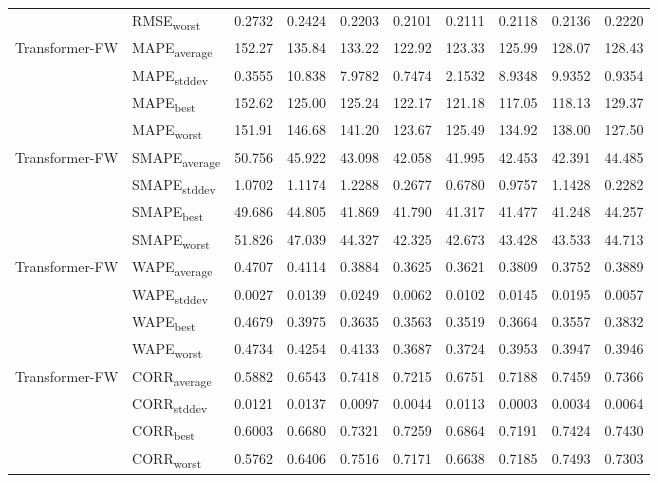 {\begin{longtable}{l l c c c c c c c c}
 & RMSE\textsubscript{worst} & 0.2732 & 0.2424 & 0.2203 & 0.2101 & 0.2111 & 0.2118 & 0.2136 & 0.2220 \\
\cmidrule(lr){2-10}
\multirow{4}{*}{Transformer-FW} & MAPE\textsubscript{average} & 152.27 & 135.84 & 133.22 & 122.92 & 123.33 & 125.99 & 128.07 & 128.43 \\
 & MAPE\textsubscript{stddev} & 0.3555 & 10.838 & 7.9782 & 0.7474 & 2.1532 & 8.9348 & 9.9352 & 0.9354 \\
 & MAPE\textsubscript{best} & 152.62 & 125.00 & 125.24 & 122.17 & 121.18 & 117.05 & 118.13 & 129.37 \\
 & MAPE\textsubscript{worst} & 151.91 & 146.68 & 141.20 & 123.67 & 125.49 & 134.92 & 138.00 & 127.50 \\
\cmidrule(lr){2-10}
\multirow{4}{*}{Transformer-FW} & SMAPE\textsubscript{average} & 50.756 & 45.922 & 43.098 & 42.058 & 41.995 & 42.453 & 42.391 & 44.485 \\
 & SMAPE\textsubscript{stddev} & 1.0702 & 1.1174 & 1.2288 & 0.2677 & 0.6780 & 0.9757 & 1.1428 & 0.2282 \\
 & SMAPE\textsubscript{best} & 49.686 & 44.805 & 41.869 & 41.790 & 41.317 & 41.477 & 41.248 & 44.257 \\
 & SMAPE\textsubscript{worst} & 51.826 & 47.039 & 44.327 & 42.325 & 42.673 & 43.428 & 43.533 & 44.713 \\
\cmidrule(lr){2-10}
\multirow{4}{*}{Transformer-FW} & WAPE\textsubscript{average} & 0.4707 & 0.4114 & 0.3884 & 0.3625 & 0.3621 & 0.3809 & 0.3752 & 0.3889 \\
 & WAPE\textsubscript{stddev} & 0.0027 & 0.0139 & 0.0249 & 0.0062 & 0.0102 & 0.0145 & 0.0195 & 0.0057 \\
 & WAPE\textsubscript{best} & 0.4679 & 0.3975 & 0.3635 & 0.3563 & 0.3519 & 0.3664 & 0.3557 & 0.3832 \\
 & WAPE\textsubscript{worst} & 0.4734 & 0.4254 & 0.4133 & 0.3687 & 0.3724 & 0.3953 & 0.3947 & 0.3946 \\
\cmidrule(lr){2-10}
\multirow{4}{*}{Transformer-FW} & CORR\textsubscript{average} & 0.5882 & 0.6543 & 0.7418 & 0.7215 & 0.6751 & 0.7188 & 0.7459 & 0.7366 \\
 & CORR\textsubscript{stddev} & 0.0121 & 0.0137 & 0.0097 & 0.0044 & 0.0113 & 0.0003 & 0.0034 & 0.0064 \\
 & CORR\textsubscript{best} & 0.6003 & 0.6680 & 0.7321 & 0.7259 & 0.6864 & 0.7191 & 0.7424 & 0.7430 \\
 & CORR\textsubscript{worst} & 0.5762 & 0.6406 & 0.7516 & 0.7171 & 0.6638 & 0.7185 & 0.7493 & 0.7303 \\

\end{longtable}}
